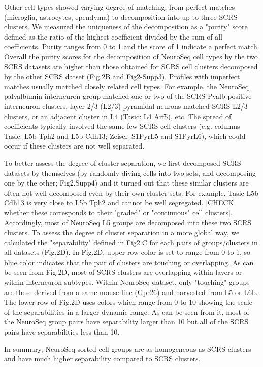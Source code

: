 Other cell types showed varying degree of matching, from perfect matches (microglia, astrocytes, ependyma) to decomposition into up to three SCRS clusters. We measured the uniqueness of the decomposition as a "purity" score defined as the ratio of the highest coefficient divided by the sum of all coefficients. Purity ranges from 0 to 1 and the score of 1 indicate a perfect match. Overall the purity scores for the decomposition of NeuroSeq cell types by the two SCRS datasets are higher than those obtained for SCRS cell clusters decomposed by the other SCRS datset (Fig.2B and Fig2-Supp3). Profiles with imperfect matches usually matched closely related cell types. For example, the NeuroSeq palvalbumin interneuron group matched one or two of the SCRS Pvalb-positive interneuron clusters, layer 2/3 (L2/3) pyramidal neurons matched SCRS L2/3 clusters, or an adjacent cluster in L4 (Tasic: L4 Arf5), etc. The spread of coefficients typically involved the same few SCRS cell clusters (e.g. columns Tasic: L5b Tph2 and L5b Cdh13; Zeisel: S1PyrL5 and S1PyrL6), which could occur if these clusters are not well separated. 

To better assess the degree of cluster separation, we first decomposed SCRS datasets by themselves (by randomly diving cells into two sets, and decomposing one by the other; Fig2.Supp4) and it turned out that these similar clusters are often not well decomposed even by their own cluster sets. For example, Tasic L5b Cdh13 is very close to L5b Tph2 and cannot be well segregated. [CHECK whether these corresponds to their "graded" or "continuous" cell clusters]. Accordingly, most of NeuroSeq L5 groups are decomposed into these two SCRS clusters. 
To assess the degree of cluster separation in a more global way, we calculated the "separability" defined in Fig2.C for each pairs of groups/clusters in all datasets (Fig.2D). In Fig.2D, upper row color is set to range from 0 to 1, so blue color indicates that the pair of clusters are touching or overlapping. As can be seen from Fig.2D, most of SCRS clusters are overlapping within layers or within interneuron subtypes. Within NeuroSeq dataset, only "touching" groups are these derived from a same mouse line (Gpr26) and harvested from L5 or L6b.  The lower row of Fig.2D uses colors which range from 0 to 10 showing the scale of the separabilities in a larger dynamic range. As can be seen from it, most of the NeuroSeq group pairs have separability larger than 10 but all of the SCRS pairs have separabilities less than 10.

In summary, NeuroSeq sorted cell groups are as homogeneous as SCRS clusters and have much higher separability compared to SCRS clusters. 









